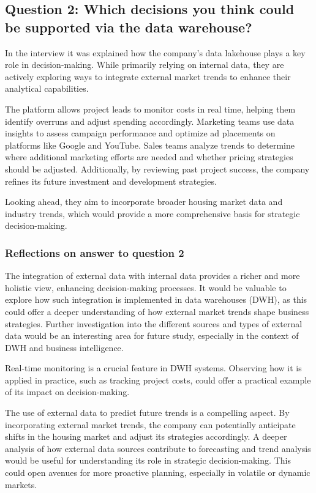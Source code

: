 \subsection{Question 2: Which decisions you think could be supported via the data warehouse?}

In the interview it was explained how the company's data lakehouse plays a key role in decision-making. While primarily relying on 
internal data, they are actively exploring ways to integrate external market trends to enhance their analytical capabilities.

The platform allows project leads to monitor costs in real time, helping them identify overruns and adjust spending accordingly. 
Marketing teams use data insights to assess campaign performance and optimize ad placements on platforms like Google and YouTube. 
Sales teams analyze trends to determine where additional marketing efforts are needed and whether pricing strategies should be adjusted. 
Additionally, by reviewing past project success, the company refines its future investment and development strategies.

Looking ahead, they aim to incorporate broader housing market data and industry trends, which would provide a more comprehensive basis 
for strategic decision-making.
\subsubsection{Reflections on answer to question 2}

The integration of external data with internal data provides a richer and more holistic view, enhancing decision-making processes. 
It would be valuable to explore how such integration is implemented in data warehouses (DWH), as this could offer a deeper understanding 
of how external market trends shape business strategies. Further investigation into the different sources and types of external data 
would be an interesting area for future study, especially in the context of DWH and business intelligence.

Real-time monitoring is a crucial feature in DWH systems. Observing how it is applied in practice, such as tracking project costs, 
could offer a practical example of its impact on decision-making.

The use of external data to predict future trends is a compelling aspect. By incorporating external market trends, the company can potentially 
anticipate shifts in the housing market and adjust its strategies accordingly. A deeper analysis of how external data sources contribute to forecasting 
and trend analysis would be useful for understanding its role in strategic decision-making. This could open avenues for more proactive planning, 
especially in volatile or dynamic markets.

